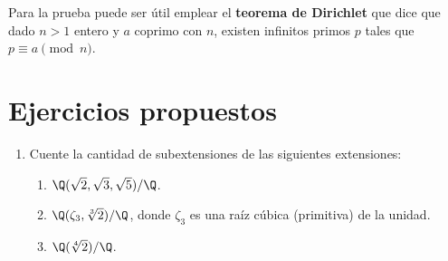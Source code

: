 \documentclass[11pt, reqno]{amsart}
\begin{document}
\begin{enumerate}
		\begin{hint}
			Para la prueba puede ser útil emplear el \textbf{teorema de Dirichlet} que dice que
			dado $n > 1$ entero y $a$ coprimo con $n$, existen infinitos primos $p$ tales que $p \equiv a
			\pmod n$.
		\end{hint}
\end{enumerate}

\appendix
\section{Ejercicios propuestos}
\begin{enumerate}
	\item Cuente la cantidad de subextensiones de las siguientes extensiones:
		\begin{enumerate}
			\item $\Q(\sqrt{2}, \sqrt{3}, \sqrt{5})/\Q$.
			\item $\Q(\zeta_3, \sqrt[3]{2})/\Q$, donde $\zeta_3$ es una raíz cúbica (primitiva) de la unidad.
			\item $\Q(\sqrt[4]{2})/\Q$.
		\end{enumerate}
\end{enumerate}

\nocite{jacobson:basic, lang:algebra}
\printbibliography
\end{document}
